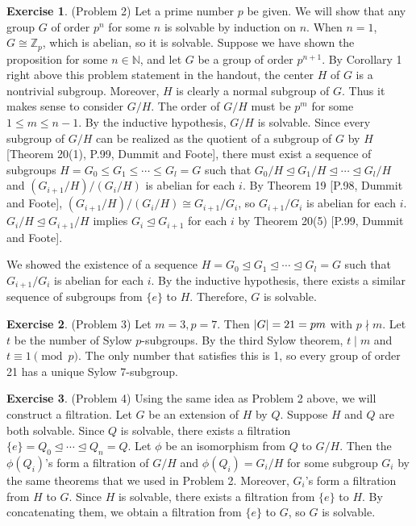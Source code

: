 \documentclass[12pt, psamsfonts]{amsart}
\theoremstyle{definition}
\newtheorem*{exer}{Exercise}
\theoremstyle{remark}
\numberwithin{equation}{section}
\begin{document}
\begin{exer}{(Problem 2)}
  Let a prime number $p$ be given.
  We will show that any group $G$ of order $p^n$ for some $n$ is solvable by induction on $n$.
  When $n = 1$, $G \cong \mathbb{Z}_p$, which is abelian, so it is solvable.
  Suppose we have shown the proposition for some $n \in \mathbb{N}$, and let $G$ be a group of order $p^{n + 1}$.
  By Corollary 1 right above this problem statement in the handout, the center $H$ of $G$ is a nontrivial subgroup.
  Moreover, $H$ is clearly a normal subgroup of $G$.
  Thus it makes sense to consider $G / H$.
  The order of $G / H$ must be $p^m$ for some $1 \leq m \leq n - 1$.
  By the inductive hypothesis, $G / H$ is solvable.
  Since every subgroup of $G / H$ can be realized as the quotient of a subgroup of $G$ by $H$[Theorem 20(1), P.99, Dummit and Foote], there must exist a sequence of subgroups $H = G_0 \leq G_1 \leq \cdots \leq G_l = G$ such that $G_0 / H \trianglelefteq G_1 / H \trianglelefteq \cdots \trianglelefteq G_l / H$ and $(G_{i + 1} / H) / (G_{i} / H)$ is abelian for each $i$.
  By Theorem 19 [P.98, Dummit and Foote], $(G_{i + 1} / H) / (G_{i} / H) \cong G_{i + 1} / G_{i}$, so $G_{i + 1} / G_i$ is abelian for each $i$.
  $G_i / H \trianglelefteq G_{i + 1} / H$ implies $G_i \trianglelefteq G_{i + 1}$ for each $i$ by Theorem 20(5) [P.99, Dummit and Foote].

  We showed the existence of a sequence $H = G_0 \trianglelefteq G_1 \trianglelefteq \cdots \trianglelefteq G_l = G$ such that $G_{i + 1} / G_i$ is abelian for each $i$.
  By the inductive hypothesis, there exists a similar sequence of subgroups from $\{ e \}$ to $H$.
  Therefore, $G$ is solvable.
\end{exer}

\begin{exer}{(Problem 3)}
  Let $m = 3, p = 7$.
  Then $\abs{G} = 21 = pm$ with $p \nmid m$.
  Let $t$ be the number of Sylow $p$-subgroups.
  By the third Sylow theorem, $t \mid m$ and $t \equiv 1 \pmod p$.
  The only number that satisfies this is 1, so every group of order 21 has a unique Sylow 7-subgroup.
\end{exer}

\begin{exer}{(Problem 4)}
  Using the same idea as Problem 2 above, we will construct a filtration.
  Let $G$ be an extension of $H$ by $Q$.
  Suppose $H$ and $Q$ are both solvable.
  Since $Q$ is solvable, there exists a filtration $\{ e \} = Q_0 \trianglelefteq \cdots \trianglelefteq Q_n = Q$.
  Let $\phi$ be an isomorphism from $Q$ to $G / H$.
  Then the $\phi(Q_i)$'s form a filtration of $G / H$ and $\phi(Q_i) = G_i / H$ for some subgroup $G_i$ by the same theorems that we used in Problem 2.
  Moreover, $G_i$'s form a filtration from $H$ to $G$.
  Since $H$ is solvable, there exists a filtration from $\{ e \}$ to $H$.
  By concatenating them, we obtain a filtration from $\{ e \}$ to $G$, so $G$ is solvable.
\end{exer}
\end{document}
